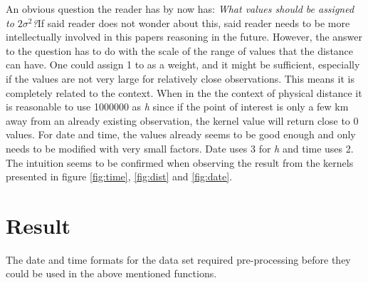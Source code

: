\documentclass[a4paper, 12pt]{article}
\begin{document}
	An obvious question the reader has by now has: \textit{What values should be assigned to \(2\sigma^2\)?}\newline If said reader does not wonder about this, said reader needs to be more intellectually involved in this papers reasoning in the future. However, the answer to the question has to do with the scale of the range of values that the distance can have. One could assign 1 to as a weight, and it might be sufficient, especially if the values are not very large for relatively close observations. This means it is completely related to the context. When in the the context of physical distance it is reasonable to use 1000000 as \textit{h} since if the point of interest is only a few km away from an already existing observation, the kernel value will return close to 0 values. For date and time, the values already seems to be good enough and only needs to be modified with very small factors. Date uses 3 for \textit{h} and time uses 2. The intuition seems to be confirmed when observing the result from the kernels presented in figure \ref{fig:time}, \ref{fig:dist} and \ref{fig:date}. 

    \section{Result}

    The date and time formats for the data set required pre-processing before they could be used in the above mentioned functions.
    
\end{document}
